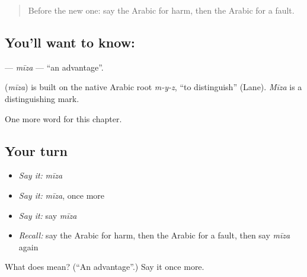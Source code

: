 \begin{quote}
Before the new one: say the Arabic for harm, then the Arabic for a fault.
\end{quote}

\subsection*{You'll want to know: }
\textbf{} — \emph{mīza} — \textquotedblleft{}an advantage\textquotedblright{}.

\begin{cousinweb}
\textbf{} (\emph{mīza}) is built on the native Arabic root \emph{m-y-z}, \textquotedblleft{}to distinguish\textquotedblright{} (Lane). \emph{Mīza} is a distinguishing mark.
\end{cousinweb}

\begin{grammarlens}[title={What you've built}]
One more word for this chapter.
\end{grammarlens}

\subsection*{Your turn}
\begin{itemize}
\raggedright
  \item \emph{Say it:} \emph{mīza}
  \item \emph{Say it:} \emph{mīza}, once more
  \item \emph{Say it:} say \emph{mīza}
  \item \emph{Recall:} say the Arabic for harm, then the Arabic for a fault, then say \emph{mīza} again
\end{itemize}

\begin{tcolorbox}[breakable,colback=teal!4,colframe=teal!35!black,title={Before you move on}]
What does  mean? (\textquotedblleft{}An advantage\textquotedblright{}.) Say it once more.
\end{tcolorbox}
